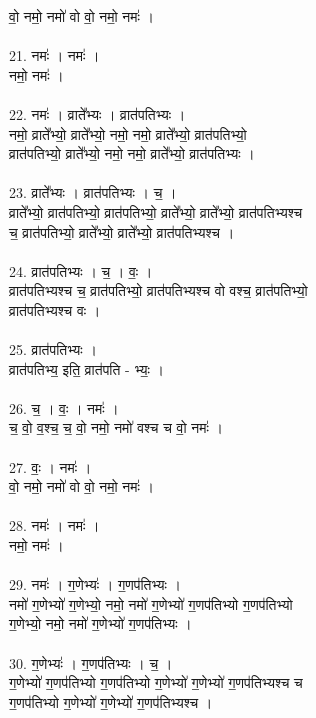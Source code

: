 वो॒ नमो॒ नमो॑ वो वो॒ नमो॒ नमः॑ ।\\
\\
21. नमः॑ । नमः॑ ।\\
नमो॒ नमः॑ ।\\
\\
22. नमः॑ । व्राते᳚भ्यः । व्रात॑पतिभ्यः ।\\
नमो॒ व्राते᳚भ्यो॒ व्राते᳚भ्यो॒ नमो॒ नमो॒ व्राते᳚भ्यो॒ व्रात॑पतिभ्यो॒\\
व्रात॑पतिभ्यो॒ व्राते᳚भ्यो॒ नमो॒ नमो॒ व्राते᳚भ्यो॒ व्रात॑पतिभ्यः ।\\
\\
23. व्राते᳚भ्यः । व्रात॑पतिभ्यः । च॒ ।\\
व्राते᳚भ्यो॒ व्रात॑पतिभ्यो॒ व्रात॑पतिभ्यो॒ व्राते᳚भ्यो॒ व्राते᳚भ्यो॒ व्रात॑पतिभ्यश्च\\
च॒ व्रात॑पतिभ्यो॒ व्राते᳚भ्यो॒ व्राते᳚भ्यो॒ व्रात॑पतिभ्यश्च ।\\
\\
24. व्रात॑पतिभ्यः । च॒ । वः॒ ।\\
व्रात॑पतिभ्यश्च च॒ व्रात॑पतिभ्यो॒ व्रात॑पतिभ्यश्च वो वश्च॒ व्रात॑पतिभ्यो॒\\
व्रात॑पतिभ्यश्च वः ।\\
\\
25. व्रात॑पतिभ्यः ।\\
व्रात॑पतिभ्य॒ इति॒ व्रात॑पति - भ्यः॒ ।\\
\\
26. च॒ । वः॒ । नमः॑ ।\\
च॒ वो॒ व॒श्च॒ च॒ वो॒ नमो॒ नमो॑ वश्च च वो॒ नमः॑ ।\\
\\
27. वः॒ । नमः॑ ।\\
वो॒ नमो॒ नमो॑ वो वो॒ नमो॒ नमः॑ ।\\
\\
28. नमः॑ । नमः॑ ।\\
नमो॒ नमः॑ ।\\
\\
29. नमः॑ । ग॒णेभ्यः॑ । ग॒णप॑तिभ्यः ।\\
नमो॑ ग॒णेभ्यो॑ ग॒णेभ्यो॒ नमो॒ नमो॑ ग॒णेभ्यो॑ ग॒णप॑तिभ्यो ग॒णप॑तिभ्यो\\
ग॒णेभ्यो॒ नमो॒ नमो॑ ग॒णेभ्यो॑ ग॒णप॑तिभ्यः ।\\
\\
30. ग॒णेभ्यः॑ । ग॒णप॑तिभ्यः । च॒ ।\\
ग॒णेभ्यो॑ ग॒णप॑तिभ्यो ग॒णप॑तिभ्यो ग॒णेभ्यो॑ ग॒णेभ्यो॑ ग॒णप॑तिभ्यश्च च\\
ग॒णप॑तिभ्यो ग॒णेभ्यो॑ ग॒णेभ्यो॑ ग॒णप॑तिभ्यश्च ।\\
\\
